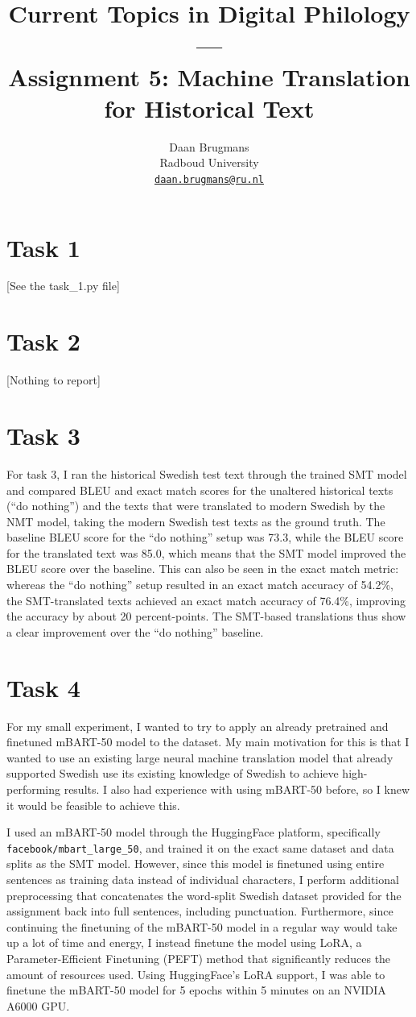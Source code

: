 \documentclass{article}
\title{Current Topics in Digital Philology --- \\Assignment 5: Machine Translation for Historical Text}
\author{%
  Daan Brugmans \\
  Radboud University\\
  \texttt{\url{daan.brugmans@ru.nl}} \\
}
\begin{document}


\maketitle

\section{Task 1}
[See the task\_1.py file]

\section{Task 2}
[Nothing to report]

\section{Task 3}
For task 3, I ran the historical Swedish test text through the trained SMT model and compared BLEU and exact match scores for the unaltered historical texts (``do nothing'') and the texts that were translated to modern Swedish by the NMT model, taking the modern Swedish test texts as the ground truth.
The baseline BLEU score for the ``do nothing'' setup was 73.3, while the BLEU score for the translated text was 85.0, which means that the SMT model improved the BLEU score over the baseline.
This can also be seen in the exact match metric: whereas the ``do nothing'' setup resulted in an exact match accuracy of 54.2\%, the SMT-translated texts achieved an exact match accuracy of 76.4\%, improving the accuracy by about 20 percent-points.
The SMT-based translations thus show a clear improvement over the ``do nothing'' baseline.

\section{Task 4}
For my small experiment, I wanted to try to apply an already pretrained and finetuned mBART-50 model to the dataset. My main motivation for this is that I wanted to use an existing large neural machine translation model that already supported Swedish use its existing knowledge of Swedish to achieve high-performing results. I also had experience with using mBART-50 before, so I knew it would be feasible to achieve this. 

I used an mBART-50 model through the HuggingFace platform, specifically \texttt{facebook/mbart\_large\_50}, and trained it on the exact same dataset and data splits as the SMT model. However, since this model is finetuned using entire sentences as training data instead of individual characters, I perform additional preprocessing that concatenates the word-split Swedish dataset provided for the assignment back into full sentences, including punctuation. Furthermore, since continuing the finetuning of the mBART-50 model in a regular way would take up a lot of time and energy, I instead finetune the model using LoRA, a Parameter-Efficient Finetuning (PEFT) method that significantly reduces the amount of resources used. Using HuggingFace's LoRA support, I was able to finetune the mBART-50 model for 5 epochs within 5 minutes on an NVIDIA A6000 GPU.
\end{document}
